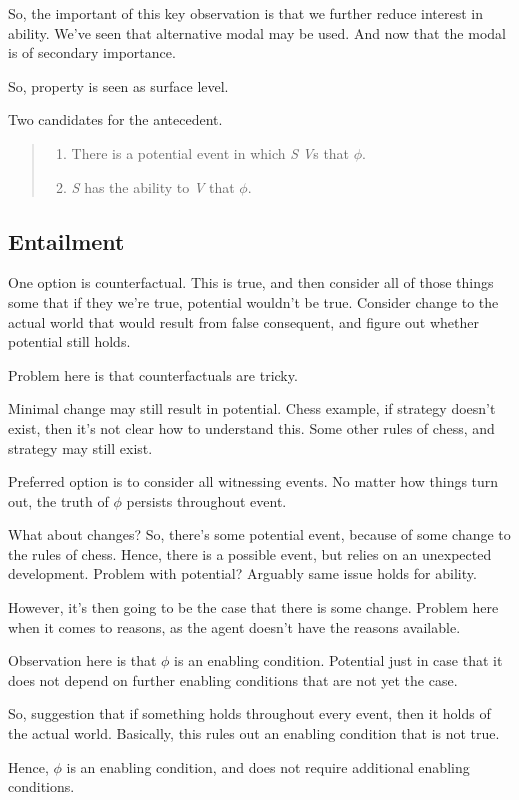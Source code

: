 \begin{note}
  So, the important of this key observation is that we further reduce interest in ability.
  We've seen that alternative modal may be used.
  And now that the modal is of secondary importance.

  So, property is seen as surface level.

  Two candidates for the antecedent.
  \begin{quote}
    \begin{enumerate}
    \item There is a potential event in which \emph{S} \emph{V}s that \(\phi\).
    \item \emph{S} has the ability to \emph{V} that \(\phi\).
    \end{enumerate}
  \end{quote}
\end{note}


\subsection{Entailment}
\label{sec:entailment-1}




\begin{note}[Counterfactual]
  One option is counterfactual.
  This is true, and then consider all of those things some that if they we're true, potential wouldn't be true.
  Consider change to the actual world that would result from false consequent, and figure out whether potential still holds.

  Problem here is that counterfactuals are tricky.

  Minimal change may still result in potential.
  Chess example, if strategy doesn't exist, then it's not clear how to understand this.
  Some other rules of chess, and strategy may still exist.
\end{note}

\begin{note}
  Preferred option is to consider all witnessing events.
  No matter how things turn out, the truth of \(\phi\) persists throughout event.

  What about changes?
  So, there's some potential event, because of some change to the rules of chess.
  Hence, there is a possible event, but relies on an unexpected development.
  Problem with potential?
  Arguably same issue holds for ability.

  However, it's then going to be the case that there is some change.
  Problem here when it comes to reasons, as the agent doesn't have the reasons available.

  Observation here is that \(\phi\) is an enabling condition.
  Potential just in case that it does not depend on further enabling conditions that are not yet the case.


  So, suggestion that if something holds throughout every event, then it holds of the actual world.
  Basically, this rules out an enabling condition that is not true.

  Hence, \(\phi\) is an enabling condition, and does not require additional enabling conditions.
\end{note}

